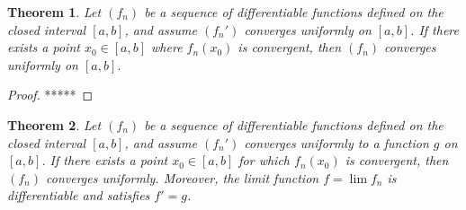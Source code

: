 \documentclass[10pt]{report}
\newtheorem{thm2}{Theorem}[section]
\begin{document}
\begin{thm2} 
Let $(f_n)$ be a sequence of differentiable functions defined on the closed interval $[a,b]$, and assume $(f_n')$ converges uniformly on $[a,b]$. If there exists a point $x_0\in[a,b]$ where $f_n(x_0)$ is convergent, then $(f_n)$ converges uniformly on $[a,b]$.
\end{thm2}
\begin{proof}
*****
\end{proof}
\begin{thm2}
Let $(f_n)$ be a sequence of differentiable functions defined on the closed interval $[a,b]$, and assume $(f_n')$ converges uniformly to a function $g$ on $[a,b]$. If there exists a point $x_0\in[a,b]$ for which $f_n(x_0)$ is convergent, then $(f_n)$ converges uniformly. Moreover, the limit function $f=\lim f_n$ is differentiable and satisfies $f'=g$.
\end{thm2}
\end{document}
